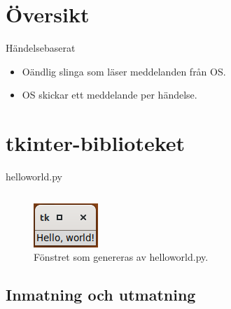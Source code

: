 \mode*

\section{Översikt}

\begin{frame}[fragile]
  \begin{block}{Händelsebaserat}
    \begin{itemize}
      \item Oändlig slinga som läser meddelanden från OS.
      \item OS skickar ett meddelande per händelse.
    \end{itemize}
  \end{block}
\end{frame}


\section{tkinter-biblioteket}

\begin{frame}[fragile]
  helloworld.py \hrulefill
  \inputminted[linenos]{python}{examples/helloworld.py}
\end{frame}

\begin{frame}
  \centering
  \begin{figure}
    \includegraphics{figs/helloworld.png}
    \caption{Fönstret som genereras av helloworld.py.}
  \end{figure}
\end{frame}

\subsection{Inmatning och utmatning}

